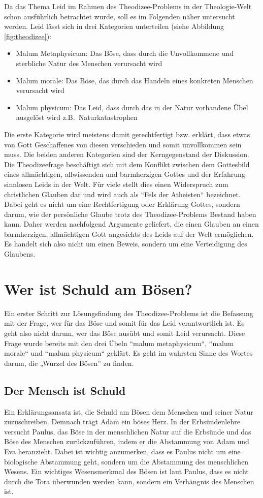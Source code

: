 Da das Thema Leid im Rahmen des Theodizee-Problems in der Theologie-Welt schon ausführlich betrachtet wurde, soll es im Folgenden näher untersucht werden. Leid lässt sich in drei Kategorien unterteilen (siehe Abbildung \ref{fig:theodizee}):
\begin{itemize}
    \item Malum Metaphysicum: Das Böse, dass durch die Unvollkommene und sterbliche Natur des Menschen verursacht wird
    \item Malum morale: Das Böse, das durch das Handeln eines konkreten Menschen verursacht wird
    \item Malum physicum: Das Leid, dass durch das in der Natur vorhandene Übel ausgelöst wird z.B.\ Naturkatastrophen
\end{itemize}
Die erste Kategorie wird meistens damit gerechtfertigt bzw. erklärt, dass etwas von Gott Geschaffenes von diesen
verschieden und somit unvollkommen sein muss. Die beiden anderen Kategorien sind der Kerngegenstand der Diskussion. Die Theodizeefrage beschäftigt sich mit dem Konflikt zwischen dem Gottesbild eines allmächtigen, allwissenden und barmherzigen Gottes und der Erfahrung sinnlosen Leids in der Welt. Für viele stellt dies einen Widerspruch zum christlichen Glauben dar und wird auch als ``Fels der Atheisten`` bezeichnet. Dabei geht es nicht um eine Rechtfertigung oder Erklärung Gottes, sondern darum, wie der persönliche Glaube trotz des Theodizee-Problems Bestand haben kann. Daher werden nachfolgend Argumente geliefert, die einen Glauben an einen barmherzigen, allmächtigen Gott angesichts des Leids auf der Welt ermöglichen. Es handelt sich also nicht um einen Beweis, sondern um eine Verteidigung des Glaubens.\\

\section{Wer ist Schuld am Bösen?}
Ein erster Schritt zur Lösungsfindung des Theodizee-Problems ist die Befassung mit der Frage, wer für das Böse und somit für das Leid verantwortlich ist. Es geht also nicht darum, wer das Böse ausübt und somit Leid verursacht. Diese Frage wurde bereits mit den drei Übeln ``malum metaphysicum``, ``malum morale`` und ``malum physicum`` geklärt. Es geht im wahrsten Sinne des Wortes darum, die „Wurzel des Bösen” zu finden.

\subsection{Der Mensch ist Schuld}
Ein Erklärungsansatz ist, die Schuld am Bösen dem Menschen und seiner Natur zuzuschreiben. Demnach trägt Adam ein böses Herz. In der Erbsündenlehre versucht Paulus, das Böse in der menschlichen Natur auf die Erbsünde und das Böse des Menschen zurückzuführen, indem er die Abstammung von Adam und Eva heranzieht. Dabei ist wichtig anzumerken, dass es Paulus nicht um eine biologische Abstammung geht, sondern um die Abstammung des menschlichen Wesens. Ein wichtiges Wesensmerkmal des Bösen ist laut Paulus, dass es nicht durch die Tora überwunden werden kann, sondern ein Verhängnis des Menschen ist. \\

